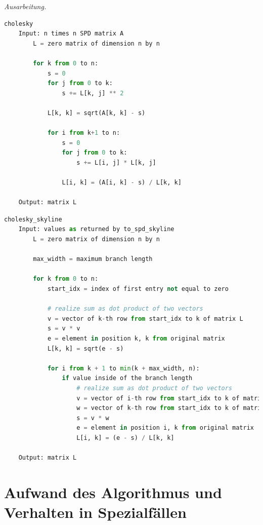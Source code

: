 \documentclass[titlepage]{article}
\newenvironment{ausarbeitung}{\vspace{3mm}\noindent\textit{Ausarbeitung.}}{}
\begin{document}
\begin{ausarbeitung}
	\begin{samepage}
	\begin{lstlisting}[language=Python, caption=Algorithmus für die Cholesky Zerlegung einer Matrix aus der Vorlesung]
	cholesky
	Input: n times n SPD matrix A	
		L = zero matrix of dimension n by n

		for k from 0 to n:
			s = 0
			for j from 0 to k:
				s += L[k, j] ** 2

			L[k, k] = sqrt(A[k, k] - s)

			for i from k+1 to n:
				s = 0
				for j from 0 to k:
					s += L[i, j] * L[k, j]

				L[i, k] = (A[i, k] - s) / L[k, k]

	Output: matrix L\end{lstlisting}
	\end{samepage}
	
	\begin{samepage}
	\begin{lstlisting}[language=Python, caption=Optimierter Algorithmus für die Cholesky Zerlegung einer Skyline-Matrix]
	cholesky_skyline
	Input: values as returned by to_spd_skyline
		L = zero matrix of dimension n by n

		max_width = maximum branch length

		for k from 0 to n:
			start_idx = index of first entry not equal to zero
			
			# realize sum as dot product of two vectors
			v = vector of k-th row from start_idx to k of matrix L
			s = v * v
			e = element in position k, k from original matrix
			L[k, k] = sqrt(e - s)

			for i from k + 1 to min(k + max_width, n):
				if value inside of the branch length
					# realize sum as dot product of two vectors
					v = vector of i-th row from start_idx to k of matrix L
					w = vector of k-th row from start_idx to k of matrix L
					s = v * w
					e = element in position i, k from original matrix
					L[i, k] = (e - s) / L[k, k]

	Output: matrix L\end{lstlisting}
	\end{samepage}
\end{ausarbeitung}
\newpage



\section{Aufwand des Algorithmus und Verhalten in Spezialfällen}
\end{document}
